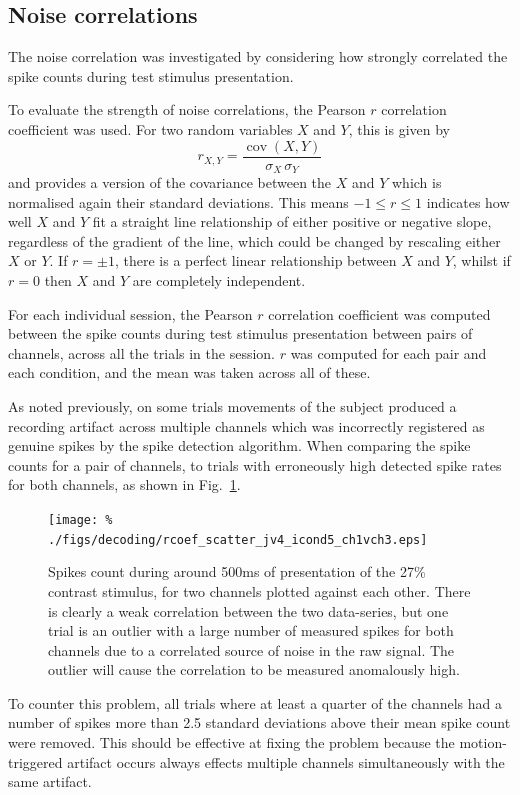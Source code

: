 \subsection{Noise correlations}
\label{sec:dec-meth-noise}

The noise correlation was investigated by considering how strongly correlated the spike counts during test stimulus presentation.

To evaluate the strength of noise correlations, the Pearson $r$ correlation coefficient was used. For two random variables $X$ and $Y$, this is given by
$$r_{X,Y} = \frac{\operatorname{cov}(X,Y)}{\sigma_X \, \sigma_Y}$$
and provides a version of the covariance between the $X$ and $Y$ which is normalised again their standard deviations.
This means $-1 \le r \le 1$ indicates how well $X$ and $Y$ fit a straight line relationship of either positive or negative slope, regardless of the gradient of the line, which could be changed by rescaling either $X$ or $Y$. If $r=\pm1$, there is a perfect linear relationship between $X$ and $Y$, whilst if $r=0$ then $X$ and $Y$ are completely independent.

For each individual session, the Pearson $r$ correlation coefficient was computed between the spike counts during test stimulus presentation between pairs of channels, across all the trials in the session. $r$ was computed for each pair and each condition, and the mean was taken across all of these.

As noted previously, on some trials movements of the subject produced a recording artifact across multiple channels which was incorrectly registered as genuine spikes by the spike detection algorithm. When comparing the spike counts for a pair of channels, to trials with erroneously high detected spike rates for both channels, as shown in Fig.~\ref{fig:noise_scatter}.

\begin{figure}[htbp]
\centering\texttt{[image: \%
./figs/decoding/rcoef\_scatter\_jv4\_icond5\_ch1vch3.eps]}
\caption{Spikes count during around 500ms of presentation of the 27\% contrast stimulus, for two channels plotted against each other. There is clearly a weak correlation between the two data-series, but one trial is an outlier with a large number of measured spikes for both channels due to a correlated source of noise in the raw signal. The outlier will cause the correlation to be measured anomalously high.}
\label{fig:noise_scatter}
\end{figure}

To counter this problem, all trials where at least a quarter of the channels had a number of spikes more than 2.5 standard deviations above their mean spike count were removed. This should be effective at fixing the problem because the motion-triggered artifact occurs always effects multiple channels simultaneously with the same artifact.
